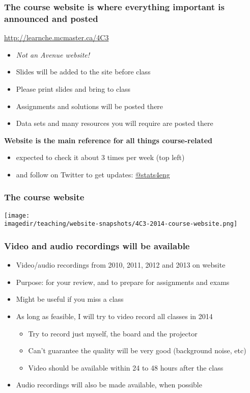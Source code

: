 \begin{frame}\frametitle{The course website is where everything important is announced and posted}

	\begin{exampleblock}{}
		\centering
		\href{http://learnche.mcmaster.ca/4C3}{http://learnche.mcmaster.ca/4C3}
	\end{exampleblock}
	\begin{itemize}
		\item	\emph{Not an Avenue website!}
		\item	Slides will be added to the site before class
		\item	Please print slides and bring to class
		\item	Assignments and solutions will be posted there
		\item	Data sets and many resources you will require are posted there
	\end{itemize}
	\vspace{12pt}
	\textbf{ Website is the main reference for all things course-related}
	\begin{itemize}
		\item	expected to check it about 3 times per week {\tiny (top left)}
		\item	and follow on Twitter to get updates: \href{https://twitter.com/stats4eng}{@stats4eng}
	\end{itemize}
\end{frame}

\begin{frame}\frametitle{The course website}
	\begin{center}
		\texttt{[image: \\imagedir/teaching/website-snapshots/4C3-2014-course-website.png]}
	\end{center}
\end{frame}


\begin{frame}\frametitle{Video and audio recordings will be available}
	\begin{itemize}
		\item	Video/audio recordings from 2010, 2011, 2012 and 2013 on website
		\item	Purpose: for your review, and to prepare for assignments and exams
		\item	Might be useful if you miss a class
		\item	As long as feasible, I will try to video record all classes in 2014
		\begin{itemize}
			\item	Try to record just myself, the board and the projector
			\item	Can't guarantee the quality will be very good (background noise, etc)
			\item	Video should be available within 24 to 48 hours after the class
		\end{itemize}
		\item	Audio recordings will also be made available, when possible
	\end{itemize}
\end{frame}


